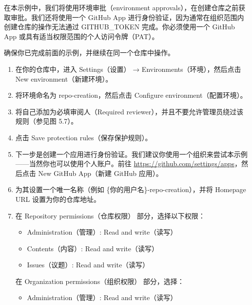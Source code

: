 在本示例中，我们将使用环境审批（environment approvals），在创建仓库之前获取审批。我们还将使用一个 GitHub App 进行身份验证，因为通常在组织范围内创建仓库的操作无法通过 GITHUB\_TOKEN 完成。你必须使用一个 GitHub App 或具有适当权限范围的个人访问令牌（PAT）。


确保你已完成前面的示例，并继续在同一个仓库中操作。


\begin{enumerate}
\item 
在你的仓库中，进入 Settings（设置） → Environments（环境），然后点击 New environment（新建环境）。

\item 
将环境命名为 repo-creation，然后点击 Configure environment（配置环境）。

\item 
将自己添加为必填审阅人（Required reviewer），并且不要允许管理员绕过该规则（参见图 5.7）。


\item 
点击 Save protection rules（保存保护规则）。

\item 
下一步是创建一个应用进行身份验证。我们建议你使用一个组织来尝试本示例——当然你也可以使用个人账户。前往 \url{https://github.com/settings/apps}，然后点击 New GitHub App（新建 GitHub 应用）。

\item 
为其设置一个唯一名称（例如 \{你的用户名\}-repo-creation），并将 Homepage URL 设置为你的仓库地址。

\item 
在 Repository permissions（仓库权限） 部分，选择以下权限：

\begin{itemize}
\item 
Administration（管理）: Read and write（读写）

\item 
Contents（内容）: Read and write（读写）

\item 
Issues（议题）: Read and write（读写）
\end{itemize}

在 Organization permissions（组织权限） 部分，选择：

\begin{itemize}
\item 
Administration（管理）: Read and write（读写）
\end{itemize}


\end{enumerate}
